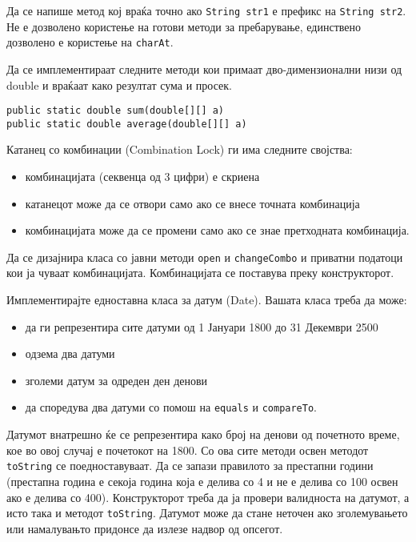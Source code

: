 

\lfoot{}
\cfoot{\thepage}
\rfoot{}
\usepackage{fancyvrb}
\usepackage{xcolor}
\usepackage{textcomp}


\begin{questions}

\question
Да се напише метод кој враќа точно ако \texttt{String str1} е префикс на \texttt{String str2}. Не
е дозволено користење на готови методи за пребарување, единствено дозволено е
користење на \texttt{charAt}.



\question
Да се имплементираат следните методи кои примаат дво-димензионални низи од
double и враќаат како резултат сума и просек.

\begin{lstlisting}
public static double sum(double[][] a)
public static double average(double[][] a)
\end{lstlisting}



\question
Катанец со комбинации (Combination Lock) ги има следните својства:
\begin{itemize}
  \item комбинацијата (секвенца од 3 цифри) е скриена
  \item катанецот може да се отвори само ако се внесе точната комбинација
  \item комбинацијата може да се промени само ако се знае претходната
  комбинација.
\end{itemize}
Да се дизајнира класа со јавни методи \texttt{open} и \texttt{changeCombo} и
приватни податоци кои ја чуваат комбинацијата. Комбинацијата се поставува преку
конструкторот.




\question
Имплементирајте едноставна класа за датум (Date). Вашата класа треба да може:
\begin{itemize}
  \item да ги репрезентира сите датуми од 1 Јануари 1800 до 31 Декември 2500
  \item одзема два датуми
  \item зголеми датум за одреден ден денови
  \item да споредува два датуми со помош на \texttt{equals} и
  \texttt{compareTo}.
\end{itemize}
Датумот внатрешно ќе се репрезентира како број на денови од почетното време, кое
во овој случај е почетокот на 1800. Со ова сите методи освен методот
\texttt{toString} се поедноставуваат. Да се запази правилото за престапни години
(престапна година е секоја година која е делива со 4 и не е делива со 100 освен
ако е делива со 400). Конструкторот треба да ја провери валидноста на датумот, а
исто така и методот \texttt{toString}. Датумот може да стане неточен ако
зголемувањето или намалувањто придонсе да излезе надвор од опсегот.


\end{questions}
